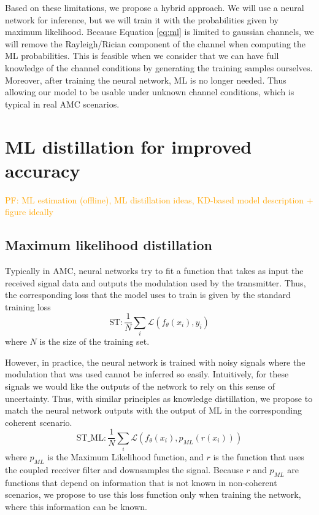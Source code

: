 \documentclass[conference]{IEEEtran}
\newcommand{\pf}[1]{{\textcolor{orange}{PF: {#1}}}}
\newcommand{\Ls}{\mathcal{L}}
\begin{document}
Based on these limitations, we propose a hybrid approach. We will use a neural network for inference, but we will train it with the probabilities given by maximum likelihood. Because Equation \ref{eq:ml} is limited to gaussian channels, we will remove the Rayleigh/Rician component of the channel when computing the ML probabilities. This is feasible when we consider that we can have full knowledge of the channel conditions by generating the training samples ourselves. Moreover, after training the neural network, ML is no longer needed. Thus allowing our model to be usable under unknown channel conditions, which is typical in real AMC scenarios.

\section{ML distillation for improved accuracy}

\pf{ML estimation (offline), ML distillation ideas, KD-based model description + figure ideally}

\subsection{Maximum likelihood distillation}

Typically in AMC, neural networks try to fit a function that takes as input the received signal data and outputs the modulation used by the transmitter. Thus, the corresponding loss that the model uses to train is given by the standard training loss
\begin{equation}
    \text{ST} : \dfrac{1}{N}\sum_{i}\Ls(f_{\theta}(x_i), y_i)
\end{equation}
where $N$ is the size of the training set.

However, in practice, the neural network is trained with noisy signals where the modulation that was used cannot be inferred so easily. Intuitively, for these signals we would like the outputs of the network to rely on this sense of uncertainty. Thus, with similar principles as knowledge distillation, we propose to match the neural network outputs with the output of ML in the corresponding coherent scenario.
\begin{equation}
    \text{ST\_ML} : \dfrac{1}{N}\sum_{i}\Ls(f_{\theta}(x_i), p_{ML}(r(x_i)))
\label{eq:st_ml}
\end{equation}
where $p_{ML}$ is the Maximum Likelihood function, and $r$ is the function that uses the coupled receiver filter and downsamples the signal. Because $r$ and $p_{ML}$ are functions that depend on information that is not known in non-coherent scenarios, we propose to use this loss function only when training the network, where this information can be known.
\end{document}
